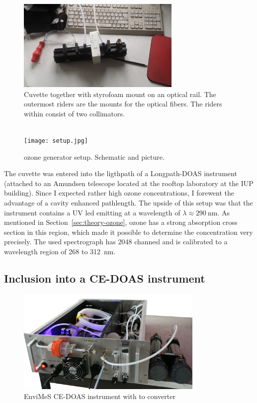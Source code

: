 \begin{figure}[htbp]
  \centering
  \includegraphics[width=0.7\textwidth]{images/cuvette.jpg}
  \caption{Cuvette together with styrofoam mount on an optical
    rail. The outermost riders are the mounts for the optical
    fibers. The riders within consist of two collimators.}
  \label{fig:cuvette}
\end{figure}

\begin{figure}[htbp]
  \centering
  {
  \def\svgwidth{0.9\linewidth}
  
  }
  \phantom{h}\\
  \vspace{2cm}
  \texttt{[image: setup.jpg]}
  \caption{ozone generator setup. Schematic and picture.}
  \label{fig:setup}
\end{figure}

The cuvette was entered into the ligthpath of a Longpath-DOAS
instrument (attached to an Amundsen telescope located at the rooftop
laboratory at the IUP building). Since I expected rather high ozone
concentrations, I forewent the advantage of a cavity enhanced
pathlength. The upside of this setup was that the instrument contains
a UV led emitting at a wavelength of
$\lambda \approx \SI{290}{\nano\meter}$. As mentioned in
Section~\ref{sec:theory-ozone}, ozone has a strong absorption cross
section in this region, which made it possible to determine the
concentration very precisely. The used spectrograph has 2048 channesl
and is calibrated to a wavelength region of \num{268} to
\SI{312}{\nano\meter}.

\subsection{Inclusion into a CE-DOAS instrument}
\label{sec:inclusion}

\begin{figure}[htbp]
  \centering
  \includegraphics[width=0.8\textwidth]{images/InstrumentEdited_small.jpg}
  \caption{EnviMeS CE-DOAS instrument with  to 
    converter}
  \label{fig:envimes}
\end{figure}

